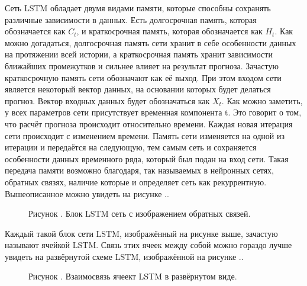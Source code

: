\subtitlespace
  
{\gostFont

  \par \redline Сеть LSTM обладает двумя видами памяти, которые способны сохранять различные зависимости в данных. Есть долгосрочная память, которая обозначается как $ C_{t} $, и краткосрочная память, которая обозначается как $ H_{t} $. Как можно догадаться, долгосрочная память сети хранит в себе особенности данных на протяжении всей истории, а краткосрочная память хранит зависимости ближайших промежутков и сильнее влияет на результат прогноза. Зачастую краткосрочную память сети обозначают как её выход. При этом входом сети является некоторый вектор данных, на основании которых будет делаться прогноз. Вектор входных данных будет обозначаться как $ X_{t} $. Как можно заметить, у всех параметров сети присутствует временная компонента t. Это говорит о том, что расчёт прогноза происходит относительно времени. Каждая новая итерация сети происходит с изменением времени. Память сети изменяется на одной из итерации и передаётся на следующую, тем самым сеть и сохраняется особенности данных временного ряда, который был подан на вход сети. Такая передача памяти возможно благодаря, так называемых в нейронных сетях, обратных связях, наличие которые и определяет сеть как рекуррентную. Вышеописанное можно увидеть на рисунке \thechaptercntr .\theimagecntr. 

  \begin{figure}[H]
    \centering
    \def\svgwidth{\textwidth}
    
    \caption*{\gostFont Рисунок \thechaptercntr .\theimagecntr \spc {--} Блок LSTM сеть с изображением обратных связей.}
    \label{fig:LSTMBlackBox}
  \end{figure} \addtocounter{imagecntr}{1}

  \par \redline Каждый такой блок сети LSTM, изображённый на рисунке выше, зачастую называют ячейкой LSTM. Связь этих ячеек между собой можно гораздо лучше увидеть на развёрнутой схеме LSTM, изображённой на рисунке \thechaptercntr .\theimagecntr. 

  \begin{figure}[H]
    \centering
    \def\svgwidth{\textwidth}
    
    \caption*{\gostFont Рисунок \thechaptercntr .\theimagecntr \spc {--} Взаимосвязь ячеект LSTM в развёрнутом виде.}
    \label{fig:LSTMSequence}
  \end{figure} \addtocounter{imagecntr}{1}

}
